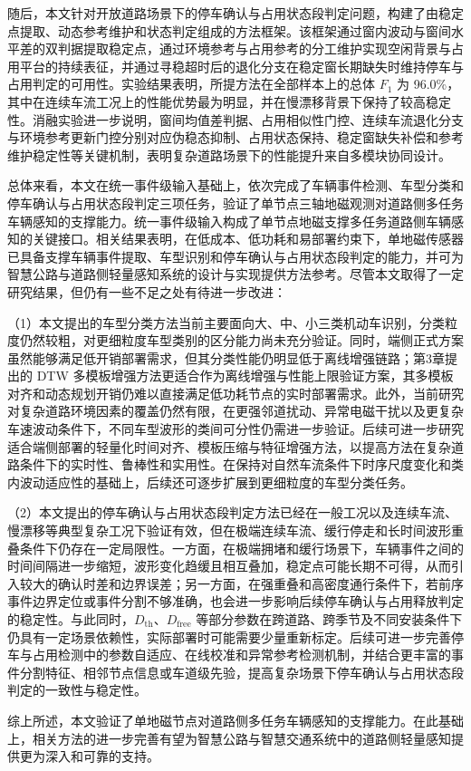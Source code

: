 \documentclass{xdupgthesis}
\begin{document}
随后，本文针对开放道路场景下的停车确认与占用状态段判定问题，构建了由稳定点提取、动态参考维护和状态判定组成的方法框架。该框架通过窗内波动与窗间水平差的双判据提取稳定点，通过环境参考与占用参考的分工维护实现空闲背景与占用平台的持续表征，并通过寻稳超时后的退化分支在稳定窗长期缺失时维持停车与占用判定的可用性。实验结果表明，所提方法在全部样本上的总体 $F_1$ 为 96.0\%，其中在连续车流工况上的性能优势最为明显，并在慢漂移背景下保持了较高稳定性。消融实验进一步说明，窗间均值差判据、占用相似性门控、连续车流退化分支与环境参考更新门控分别对应伪稳态抑制、占用状态保持、稳定窗缺失补偿和参考维护稳定性等关键机制，表明复杂道路场景下的性能提升来自多模块协同设计。

总体来看，本文在统一事件级输入基础上，依次完成了车辆事件检测、车型分类和停车确认与占用状态段判定三项任务，验证了单节点三轴地磁观测对道路侧多任务车辆感知的支撑能力。统一事件级输入构成了单节点地磁支撑多任务道路侧车辆感知的关键接口。相关结果表明，在低成本、低功耗和易部署约束下，单地磁传感器已具备支撑车辆事件提取、车型识别和停车确认与占用状态段判定的能力，并可为智慧公路与道路侧轻量感知系统的设计与实现提供方法参考。尽管本文取得了一定研究结果，但仍有一些不足之处有待进一步改进：

（1）本文提出的车型分类方法当前主要面向大、中、小三类机动车识别，分类粒度仍然较粗，对更细粒度车型类别的区分能力尚未充分验证。同时，端侧正式方案虽然能够满足低开销部署需求，但其分类性能仍明显低于离线增强链路；第3章提出的 DTW 多模板增强方法更适合作为离线增强与性能上限验证方案，其多模板对齐和动态规划开销仍难以直接满足低功耗节点的实时部署需求。此外，当前研究对复杂道路环境因素的覆盖仍然有限，在更强邻道扰动、异常电磁干扰以及更复杂车速波动条件下，不同车型波形的类间可分性仍需进一步验证。后续可进一步研究适合端侧部署的轻量化时间对齐、模板压缩与特征增强方法\cite{ch5_salvador2007fastdtw}，以提高方法在复杂道路条件下的实时性、鲁棒性和实用性。在保持对自然车流条件下时序尺度变化和类内波动适应性的基础上，后续还可逐步扩展到更细粒度的车型分类任务\cite{ch3_xu2017featuresets}。

（2）本文提出的停车确认与占用状态段判定方法已经在一般工况以及连续车流、慢漂移等典型复杂工况下验证有效，但在极端连续车流、缓行停走和长时间波形重叠条件下仍存在一定局限性。一方面，在极端拥堵和缓行场景下，车辆事件之间的时间间隔进一步缩短，波形变化趋缓且相互叠加，稳定点可能长期不可得，从而引入较大的确认时差和边界误差；另一方面，在强重叠和高密度通行条件下，若前序事件边界定位或事件分割不够准确，也会进一步影响后续停车确认与占用释放判定的稳定性。与此同时，$D_{\mathrm{th}}$、$D_{\mathrm{free}}$ 等部分参数在跨道路、跨季节及不同安装条件下仍具有一定场景依赖性，实际部署时可能需要少量重新标定。后续可进一步完善停车与占用检测中的参数自适应、在线校准和异常参考检测机制\cite{ch5_cao2020magcal}，并结合更丰富的事件分割特征、相邻节点信息或车道级先验，提高复杂场景下停车确认与占用状态段判定的一致性与稳定性。

综上所述，本文验证了单地磁节点对道路侧多任务车辆感知的支撑能力。在此基础上，相关方法的进一步完善有望为智慧公路与智慧交通系统中的道路侧轻量感知提供更为深入和可靠的支持。
\end{document}
